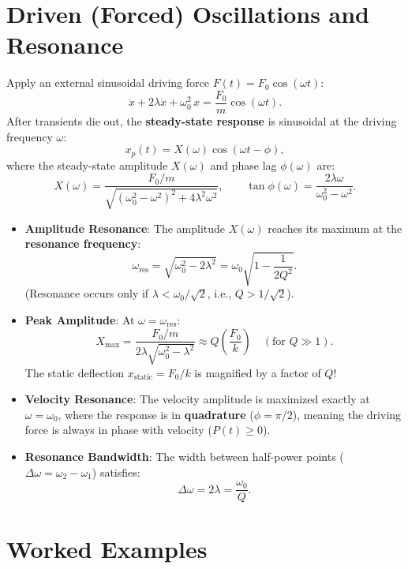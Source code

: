 \section{Driven (Forced) Oscillations and Resonance}

Apply an external sinusoidal driving force $F(t) = F_0\cos(\omega t)$:
\[
\boxed{\ddot{x} + 2\lambda\dot{x} + \omega_0^2\,x = \frac{F_0}{m}\cos(\omega t).}
\]
After transients die out, the \textbf{steady-state response} is sinusoidal at the driving frequency $\omega$:
\[
\boxed{x_p(t) = X(\omega)\cos(\omega t - \phi),}
\]
where the steady-state amplitude $X(\omega)$ and phase lag $\phi(\omega)$ are:
\[
\boxed{X(\omega) = \frac{F_0/m}{\sqrt{(\omega_0^2 - \omega^2)^2 + 4\lambda^2\omega^2}},} \qquad \boxed{\tan\phi(\omega) = \frac{2\lambda\omega}{\omega_0^2 - \omega^2}.}
\]

\begin{keyidea}
\begin{itemize}[leftmargin=1.4em,itemsep=2pt]
  \item \textbf{Amplitude Resonance}: The amplitude $X(\omega)$ reaches its maximum at the \textbf{resonance frequency}:
        \[
        \boxed{\omega_{\text{res}} = \sqrt{\omega_0^2 - 2\lambda^2} = \omega_0\sqrt{1 - \frac{1}{2Q^2}}.}
        \]
        (Resonance occurs only if $\lambda < \omega_0/\sqrt{2}$, i.e., $Q > 1/\sqrt{2}$).
  \item \textbf{Peak Amplitude}: At $\omega = \omega_{\text{res}}$:
        \[
        X_{\max} = \frac{F_0/m}{2\lambda\sqrt{\omega_0^2 - \lambda^2}} \approx Q\left(\frac{F_0}{k}\right) \quad (\text{for } Q \gg 1).
        \]
        The static deflection $x_{\text{static}} = F_0/k$ is magnified by a factor of $Q$!
  \item \textbf{Velocity Resonance}: The velocity amplitude is maximized exactly at $\omega = \omega_0$, where the response is in \textbf{quadrature} ($\phi = \pi/2$), meaning the driving force is always in phase with velocity ($P(t) \ge 0$).
  \item \textbf{Resonance Bandwidth}: The width between half-power points ($\Delta\omega = \omega_2 - \omega_1$) satisfies:
        \[
        \boxed{\Delta\omega = 2\lambda = \frac{\omega_0}{Q}.}
        \]
\end{itemize}
\end{keyidea}

\section{Worked Examples}

